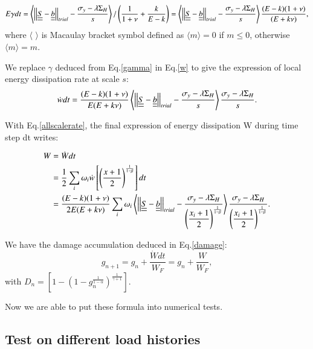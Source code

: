 \documentclass[3p,times,procedia,number]{elsarticle}
\begin{document}
\begin{equation}E\gamma dt=\left\langle \left| \left|\uline{\uline{S}}-\uline{\uline{b}}\right| \right|_{trial}-\dfrac{\sigma_y-\lambda \Sigma_H}{s}\right\rangle /\left(\dfrac{1}{1+\nu}+\dfrac{k}{E-k} \right)=\left\langle \left| \left|\uline{\uline{S}}-\uline{\uline{b}}\right| \right|_{trial}-\dfrac{\sigma_y-\lambda \Sigma_H}{s}\right\rangle\dfrac{(E-k)(1+\nu) }{(E+k\nu)},
	\label{gamma}
\end{equation}
where $\langle$ $\rangle$ is Macaulay bracket symbol defined as $\langle m\rangle=0$ if $m\leqslant0$, otherwise $\langle m\rangle=m$.

We replace $\gamma$ deduced from Eq.\eqref{gamma} in Eq.\eqref{w} to give the expression of local energy dissipation rate at scale $s$:
\begin{equation}
	\dot{w}dt=\dfrac{(E-k)(1+\nu) }{E(E+k\nu)}\left\langle  \left| \left|\uline{\uline{S}}-\uline{\uline{b}}\right| \right|_{trial}-\dfrac{\sigma_y-\lambda \Sigma_H}{s}\right\rangle \dfrac{\sigma_y-\lambda \Sigma_H}{s}.
	\label{dW}
\end{equation}

With Eq.\eqref{allscalerate}, the final expression of energy dissipation W during time step dt writes:

\begin{equation}
	\begin{split}
		W&=\dot{W}dt
		\\&=\frac{1}{2}\sum_{i}\omega_i\dot{w}\left[  \left( \frac{x+1}{2}\right) ^{\frac{1}{1-\beta}}\right]dt
		\\&=\dfrac{(E-k)(1+\nu) }{2E(E+k\nu)}\sum_{i}\omega_i\left\langle  \left| \left|\uline{\uline{S}}-\uline{\uline{b}}\right| \right|_{trial}-\dfrac{\sigma_y-\lambda \Sigma_H}{\left( \dfrac{x_i+1}{2}\right) ^{\frac{1}{1-\beta}}}\right\rangle \dfrac{\sigma_y-\lambda \Sigma_H}{\left( \dfrac{x_i+1}{2}\right) ^{\frac{1}{1-\beta}}}.
	\end{split}
	\label{finaldw}
\end{equation}


We have the damage accumulation deduced in Eq.\eqref{damage}:
$$g_{n+1}=g_n+\dfrac{\dot{W}dt}{W_F}=g_n+\dfrac{W}{W_F},$$
with $D_n=\left[1-\left(1-g_n^{\frac{1}{1-\alpha}} \right)^{\frac{1}{\gamma+1}}  \right]. $

Now we are able to put these formula into numerical tests.

\subsection{Test on different load histories}
\end{document}
